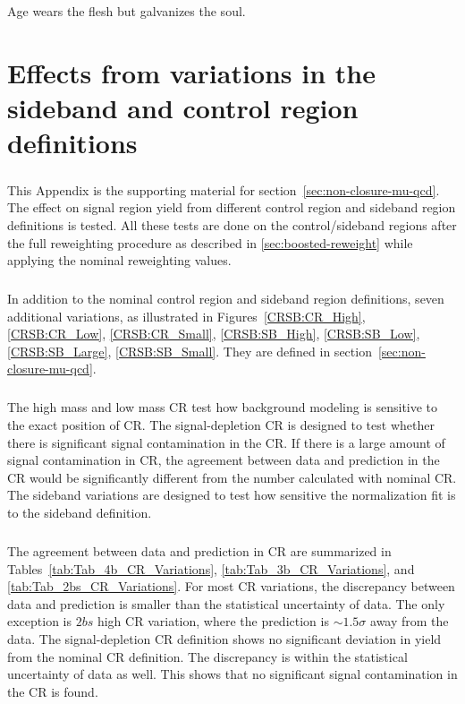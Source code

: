 \begin{savequote}[75mm]
Age wears the flesh but galvanizes the soul.   
\end{savequote}
\chapter{Effects from variations in the sideband and control region definitions}
\label{app:appendixSysVar}

\paragraph{}
This Appendix is the supporting material for section~\ref{sec:non-closure-mu-qcd}. 
The effect on signal region yield from different control region and sideband region definitions is tested. 
All these tests are done on the control/sideband regions after the full reweighting procedure as described in \ref{sec:boosted-reweight} while applying the nominal reweighting values.

\paragraph{}
In addition to the nominal control region and sideband region definitions, seven additional variations, as illustrated in Figures~\ref{CRSB:CR_High}, \ref{CRSB:CR_Low}, \ref{CRSB:CR_Small}, \ref{CRSB:SB_High}, \ref{CRSB:SB_Low}, \ref{CRSB:SB_Large}, \ref{CRSB:SB_Small}. 
They are defined in section~\ref{sec:non-closure-mu-qcd}.

\paragraph{}
The high mass and low mass CR test how background modeling is sensitive to the exact position of CR. 
The signal-depletion CR is designed to test whether there is significant signal contamination in the CR. 
If there is a large amount of signal contamination in CR, the agreement between data and prediction in the CR would be significantly different from the number calculated with nominal CR. 
The sideband variations are designed to test how sensitive the normalization fit is to the sideband definition.

\paragraph{}
The agreement between data and prediction in CR are summarized in Tables~\ref{tab:Tab_4b_CR_Variations}, \ref{tab:Tab_3b_CR_Variations}, and \ref{tab:Tab_2bs_CR_Variations}.
For most CR variations, the discrepancy between data and prediction is smaller than the statistical uncertainty of data. 
The only exception is $2bs$ high CR variation, where the prediction is $\sim 1.5 \sigma$ away from the data.
The signal-depletion CR definition shows no significant deviation in yield from the nominal CR definition.
The discrepancy is within the statistical uncertainty of data as well.
This shows that no significant signal contamination in the CR is found.

